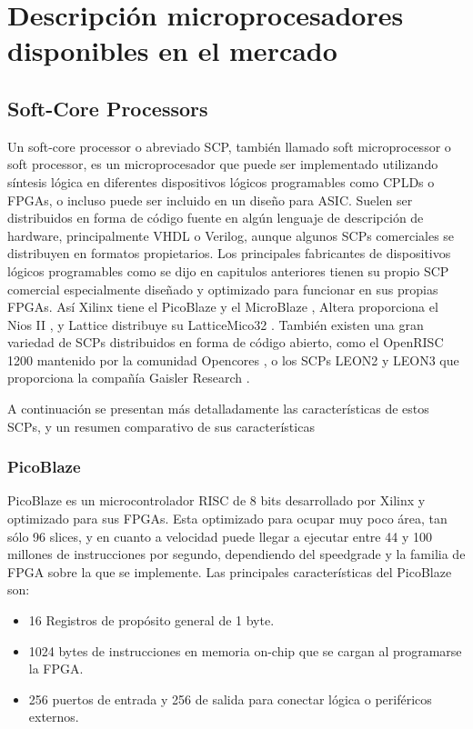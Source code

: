
\chapter{Descripción microprocesadores disponibles en el mercado}
	\section{Soft-Core Processors}
	Un soft-core processor o abreviado SCP, también llamado soft microprocessor o soft  processor, es un microprocesador que puede ser implementado
	utilizando síntesis lógica en  diferentes dispositivos lógicos programables como CPLDs o FPGAs, o incluso puede ser incluido en un diseño para ASIC.
 	Suelen ser distribuidos en forma de código fuente en algún lenguaje de descripción de hardware, principalmente VHDL o Verilog, aunque  algunos SCPs
 	comerciales se distribuyen en formatos propietarios.
	Los principales fabricantes de dispositivos lógicos programables como se dijo en capitulos anteriores tienen su propio  SCP comercial especialmente
	diseñado y optimizado para funcionar en sus propias FPGAs. Así Xilinx tiene el PicoBlaze \cite{Etiqueta15} y el MicroBlaze \cite{Etiqueta16}, Altera
	proporciona el Nios II \cite{Etiqueta17}, y Lattice distribuye su LatticeMico32 \cite{Etiqueta18}. También existen una gran variedad de SCPs
	distribuidos en forma de código abierto, como el OpenRISC 1200 \cite{Etiqueta19} mantenido por la comunidad Opencores \cite{Etiqueta20}, o los  SCPs
	LEON2 y LEON3 \cite{Etiqueta21} \cite{Etiqueta22} que proporciona la compañía Gaisler Research \cite{Etiqueta23}.
		
	A continuación se presentan más detalladamente las características de estos SCPs, y un resumen comparativo de sus características
	\subsection{PicoBlaze}
	
	PicoBlaze es un microcontrolador RISC de 8 bits desarrollado por Xilinx y optimizado para sus FPGAs. Esta optimizado para ocupar muy poco área, tan sólo 96 slices, y en cuanto a velocidad puede llegar a ejecutar entre 44 y 100 millones de instrucciones por segundo, dependiendo del speedgrade y la familia de FPGA sobre la que se implemente. Las principales características del PicoBlaze son:
	
  
	\begin{itemize}
	  \item  16 Registros de propósito general de 1 byte.
	  \item 1024 bytes de instrucciones en memoria on-chip que se cargan al programarse la FPGA.
	  \item 256 puertos de entrada y 256 de salida para conectar lógica o periféricos externos.
	\end{itemize}
	
